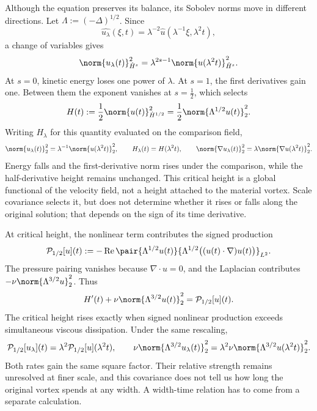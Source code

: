 Although the equation preserves its balance, its Sobolev norms move in different directions. Let \(\Lambda:=(-\Delta)^{1/2}\). Since
\[
  \widehat{u_\lambda}(\xi,t)
  =
  \lambda^{-2}\widehat u(\lambda^{-1}\xi,\lambda^2t),
\]
a change of variables gives
\[
  \norm{u_\lambda(t)}_{\dot H^s}^2
  =
  \lambda^{2s-1}
  \norm{u(\lambda^2t)}_{\dot H^s}^2.
\]
At \(s=0\), kinetic energy loses one power of \(\lambda\). At \(s=1\), the first derivatives gain one. Between them the exponent vanishes at \(s=\tfrac12\), which selects
\[
  H(t)
  :=
  \frac12\norm{u(t)}_{\dot H^{1/2}}^2
  =
  \frac12\norm{\Lambda^{1/2}u(t)}_2^2.
\]
Writing \(H_\lambda\) for this quantity evaluated on the comparison field,
\[
  \norm{u_\lambda(t)}_2^2
  =
  \lambda^{-1}\norm{u(\lambda^2t)}_2^2,
  \qquad
  H_\lambda(t)=H(\lambda^2t),
  \qquad
  \norm{\nabla u_\lambda(t)}_2^2
  =
  \lambda\norm{\nabla u(\lambda^2t)}_2^2.
\]
Energy falls and the first-derivative norm rises under the comparison, while the half-derivative height remains unchanged. This critical height is a global functional of the velocity field, not a height attached to the material vortex. Scale covariance selects it, but does not determine whether it rises or falls along the original solution; that depends on the sign of its time derivative.


At critical height, the nonlinear term contributes the signed production
\[
  \mathcal P_{1/2}[u](t)
  :=
  -\operatorname{Re}
  \pair
    {\Lambda^{1/2}u(t)}
    {\Lambda^{1/2}\bigl((u(t)\cdot\nabla)u(t)\bigr)}_{L^2}.
\]
The pressure pairing vanishes because \(\nabla\cdot u=0\), and the Laplacian contributes \(-\nu\norm{\Lambda^{3/2}u}_2^2\). Thus
\[
  H'(t)
  +
  \nu\norm{\Lambda^{3/2}u(t)}_2^2
  =
  \mathcal P_{1/2}[u](t).
\]
The critical height rises exactly when signed nonlinear production exceeds simultaneous viscous dissipation. Under the same rescaling,
\[
  \mathcal P_{1/2}[u_\lambda](t)
  =
  \lambda^2\mathcal P_{1/2}[u](\lambda^2t),
  \qquad
  \nu\norm{\Lambda^{3/2}u_\lambda(t)}_2^2
  =
  \lambda^2\nu\norm{\Lambda^{3/2}u(\lambda^2t)}_2^2.
\]
Both rates gain the same square factor. Their relative strength remains unresolved at finer scale, and this covariance does not tell us how long the original vortex spends at any width. A width-time relation has to come from a separate calculation.


